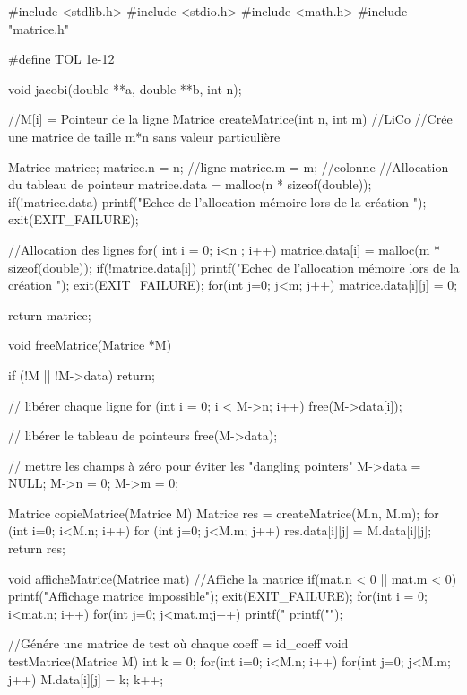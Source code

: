 \documentclass[12pt]{article}
\begin{document}
\begin{C}
#include <stdlib.h>
#include <stdio.h>
#include <math.h>
#include "matrice.h"

#define TOL 1e-12

void jacobi(double **a, double **b, int n);

//M[i] = Pointeur de la ligne
Matrice createMatrice(int n, int m) //LiCo //Crée une matrice de taille m*n sans valeur particulière
{
    Matrice matrice;
    matrice.n = n; //ligne
    matrice.m = m; //colonne
    //Allocation du tableau de pointeur
    matrice.data = malloc(n * sizeof(double));
    if(!matrice.data)
    {
        printf("Echec de l'allocation mémoire lors de la création \n");
        exit(EXIT_FAILURE);
    }
    
    //Allocation des lignes
    for( int i = 0; i<n ; i++)
    {
        matrice.data[i] = malloc(m * sizeof(double));
        if(!matrice.data[i])
        {
            printf("Echec de l'allocation mémoire lors de la création \n");
            exit(EXIT_FAILURE);
        }
        for(int j=0; j<m; j++)
        {
            matrice.data[i][j] = 0;
        }
    }
    
    return matrice;
}

void freeMatrice(Matrice *M) {
    if (!M || !M->data) return;
    
    // libérer chaque ligne
    for (int i = 0; i < M->n; i++) {
        free(M->data[i]);
    }
    
    // libérer le tableau de pointeurs
    free(M->data);
    
    // mettre les champs à zéro pour éviter les "dangling pointers"
    M->data = NULL;
    M->n = 0;
    M->m = 0;
}

Matrice copieMatrice(Matrice M){
    Matrice res = createMatrice(M.n, M.m);
    for (int i=0; i<M.n; i++) {
        for (int j=0; j<M.m; j++) {
            res.data[i][j] = M.data[i][j];
        }
    }
    return res;
}

void afficheMatrice(Matrice mat) //Affiche la matrice
{
    if(mat.n < 0 || mat.m < 0){
        printf("Affichage matrice impossible\n");
        exit(EXIT_FAILURE);
    }
    for(int i = 0; i<mat.n; i++)
    {
        for(int j=0; j<mat.m;j++)
        {
            printf("%
        }
        printf("\n");
    }
}

//Génére une matrice de test où chaque coeff = id_coeff
void testMatrice(Matrice M)
{
    int k = 0;
    for(int i=0; i<M.n; i++)
    {
        for(int j=0; j<M.m; j++)
        {
            M.data[i][j] = k;
            k++;
        }
    }
}


\end{C}
\end{document}
